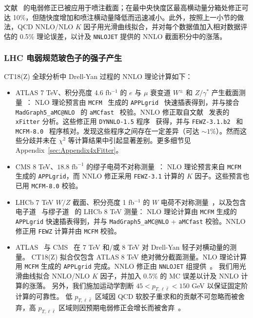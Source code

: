 文献~\cite{Dittmaier:2012kx} 的电弱修正已被应用于喷注截面；在最中央快度区最高横动量分箱处修正可达 10\%，但随快度增加和喷注横动量降低而迅速减小。此外，按照上一小节的做法，QCD NNLO/NLO $K$ 因子用光滑曲线拟合，并对每个数据值加入相对数据评估的 0.5\% 理论误差，以计及 \texttt{NNLOJET} 提供的 NNLO 截面积分中的涨落。


\subsubsection{LHC 电弱规范玻色子的强子产生
\label{sec:LHCEWbosons}}
CT18(Z) 全球分析中 Drell-Yan 过程的 NNLO 理论计算如下：

\begin{itemize}
\item ATLAS 7 TeV、积分亮度 4.6 fb$^{-1}$ 的 $e$ 与 $\mu$ 衰变道 $W^{\pm}$ 和 $Z/\gamma^{*}$ 产生截面测量~\cite{Aaboud:2016btc}：
NLO 理论预言由 \texttt{MCFM}~\cite{Campbell:2010ff} 生成的 \texttt{APPLgrid}~\cite{Carli:2010rw} 快速插表得到，并与接合 \texttt{MadGraph5\_aMC@NLO}~\cite{Alwall:2014hca} 的 \texttt{aMCfast}~\cite{Bertone:2014zva} 校验。NNLO 修正取自文献~\cite{Aaboud:2016btc} 发表的 \texttt{xFitter} 分析。这些修正用 \texttt{DYNNLO-1.5} 程序~\cite{Catani:2007vq,Catani:2009sm} 获得，并与 \texttt{FEWZ-3.1.b2}~\cite{Gavin:2010az,Gavin:2012sy,Li:2012wna} 和 \texttt{MCFM-8.0}~\cite{Boughezal:2016wmq} 程序核对。发现这些程序之间存在一定差异（可达 $\sim\!1\%$）。然而这些分歧并未在 $\chi^2$ 等计算结果中引起显著差别。更多细节见 Appendix~\ref{sec:Appendix4xFitter}。


\item CMS 8 TeV、$18.8 \mbox{ fb}^{-1}$ 的缪子电荷不对称测量~\cite{Khachatryan:2016pev}：
NLO 理论预言来自 \texttt{MCFM} 生成的 \texttt{APPLgrid}，而 NNLO 修正采用 \texttt{FEWZ-3.1} 计算的 $K$ 因子。这些预言也已用 \texttt{MCFM-8.0} 校验。

\item LHCb 7 TeV $W/Z$ 截面、积分亮度 1 fb$^{-1}$ 的 $W$ 电荷不对称测量~\cite{Aaij:2015gna}，以及包含电子道~\cite{Aaij:2015vua} 与缪子道~\cite{Aaij:2015zlq} 的 LHCb 8 TeV 测量：
NLO 理论计算由 \texttt{MCFM} 生成的 \texttt{APPLgrid} 快速插表得到，并与 \texttt{MadGraph5\_aMC@NLO} + \texttt{aMCfast} 校验。NNLO 修正用 \texttt{FEWZ} 计算并由 \texttt{MCFM} 校验。

\item ATLAS~\cite{Aad:2014xaa,Aad:2015auj} 与 CMS~\cite{Khachatryan:2015oaa} 在 7 TeV 和/或 8 TeV 对 Drell-Yan 轻子对横动量的测量。
CT18(Z) 拟合仅包含 ATLAS 8 TeV 绝对微分截面测量。NLO 理论计算用 \texttt{MCFM} 生成的 \texttt{APPLgrid} 完成。NNLO 修正由 \texttt{NNLOJET} 组提供~\cite{Ridder:2015dxa,Gehrmann-DeRidder:2017mvr}。
我们用光滑曲线拟合 NNLO/NLO $K$ 因子，并加入 0.5\% 的 MC 误差以计及 NNLO 计算的涨落。
另外，我们施加运动学割断 $45\!<\!p_{T,  \ell \bar \ell}\!<\!150$ GeV 以保证固定阶计算的可靠性。
低 $p_{T,  \ell \bar \ell}$ 区域因 QCD 软胶子重求和的贡献不可忽略而被舍弃，高 $p_{T,  \ell \bar \ell}$ 区域则因预期电弱修正会增长而被舍弃~\cite{Hollik:2015pja,Kallweit:2015fta}。

\end{itemize}

